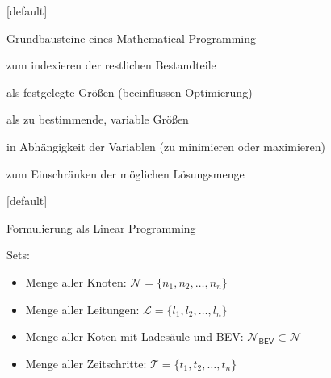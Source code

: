 \documentclass[aspectratio=169]{beamer}
\makeatletter
\newenvironment{withoutheadline}{
        \setbeamertemplate{headline}[default]
        \def\beamer@entrycode{\vspace*{-\headheight}}
    }{}
\makeatother
\begin{document}
\begin{withoutheadline}
\begin{frame}[noframenumbering]{Grundbausteine eines Mathematical Programming}
	\begin{description}[Restriktionen]
		\item[Sets] zum indexieren der restlichen Bestandteile
		\item[Parameter] als festgelegte Größen (beeinflussen Optimierung)
		\item[Variablen] als zu bestimmende, variable Größen
		\item[Zielfunktion] in Abhängigkeit der Variablen (zu minimieren oder
		maximieren)
		\item[Restriktionen] zum Einschränken der möglichen Lösungsmenge
	\end{description}
	
\end{frame}
\end{withoutheadline}


\begin{withoutheadline}
\begin{frame}[noframenumbering]{Formulierung als Linear Programming}
	\begin{Large}
		Sets:
	\end{Large}
	\begin{itemize}
		\item Menge aller Knoten: $\mathcal{N}=\{n_1, n_2,\dots,n_n\}$
		\item Menge aller Leitungen: $\mathcal{L}=\{l_1,l_2,\dots,l_n\}$
		\item Menge aller Koten mit Ladesäule und BEV:
		$\mathcal{N}_\mathsf{BEV}\subset\mathcal{N}$
		\item Menge aller Zeitschritte: $\mathcal{T}=\{t_1,t_2,\dots,t_n\}$
	\end{itemize}
\end{frame}
\end{withoutheadline}
\end{document}
